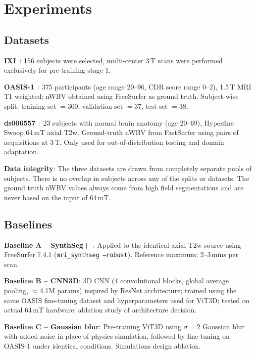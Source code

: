 \documentclass[12pt,a4paper]{article}
\begin{document}
\section{Experiments}
\label{sec:experiments}

\subsection{Datasets}

\textbf{IXI}~\cite{ixi2017}: 156 subjects were selected, multi-center 3\,T
scans were performed exclusively for pre-training stage 1.

\textbf{OASIS-1}~\cite{marcus2007oasis}: 375 participants (age range 20--96,
CDR score range 0--2), 1.5\,T MRI T1 weighted; nWBV obtained using
FreeSurfer as ground truth. Subject-wise split: training set $= 300$,
validation set $= 37$, test set $= 38$.

\textbf{ds006557}~\cite{vasa2025}: 23 subjects with normal brain anatomy (age
20--69), Hyperfine Swoop 64\,mT axial T2w. Ground-truth nWBV from FastSurfer
using pairs of acquisitions at 3\,T. Only used for out-of-distribution
testing and domain adaptation.

\textbf{Data integrity}: The three datasets are drawn from completely separate
pools of subjects. There is no overlap in subjects across any of the splits or
datasets. The ground truth nWBV values always come from high field
segmentations and are never based on the input of 64\,mT.

\subsection{Baselines}

\textbf{Baseline A -- SynthSeg+}~\cite{billot2023synthseg}: Applied to the
identical axial T2w source using FreeSurfer 7.4.1
(\texttt{mri\_synthseg --robust}). Reference maximum; 2--3\,mins per scan.

\textbf{Baseline B -- CNN3D}: 3D CNN (4 convolutional blocks, global average
pooling, $\approx$4.1M params) inspired by ResNet architecture; trained using
the same OASIS fine-tuning dataset and hyperparameters used for ViT3D; tested
on actual 64\,mT hardware; ablation study of architecture decision.

\textbf{Baseline C -- Gaussian blur}: Pre-training ViT3D using $\sigma = 2$
Gaussian blur with added noise in place of physics simulation, followed by
fine-tuning on OASIS-1 under identical conditions. Simulations design
ablation.
\end{document}
